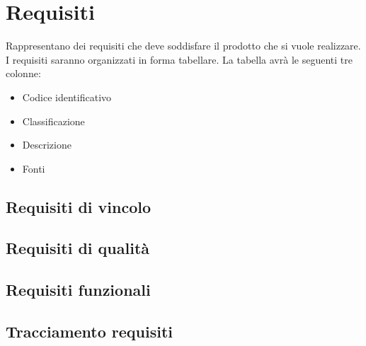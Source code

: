 \section{Requisiti}
    Rappresentano dei requisiti che deve soddisfare il prodotto che si vuole realizzare.
    I requisiti saranno organizzati in forma tabellare.
    La tabella avrà le seguenti tre colonne:
    \begin{itemize}
        \item Codice identificativo
        \item Classificazione
        \item Descrizione
        \item Fonti
    \end{itemize}
\subsection{Requisiti di vincolo}
\subsection{Requisiti di qualità}
\subsection{Requisiti funzionali}
\subsection{Tracciamento requisiti}